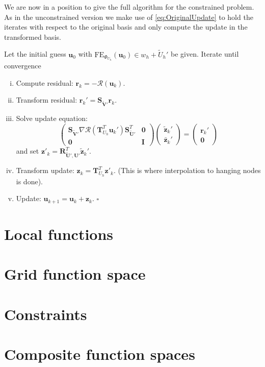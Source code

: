 We are now in a position to give the full algorithm for the
constrained problem. As in the unconstrained version we make use of
\eqref{eq:OriginalUpdate} to hold the iterates with respect to the
original basis and only compute the update in the transformed basis. 

\begin{algo}
Let the initial guess $\mathbf{u}_{0}$ with
$\text{FE}_{\Phi_{U_h}}(\mathbf{u}_{0}) \in w_h + \tilde{U}_h'$ be given. 
Iterate until convergence
\begin{enumerate}[i)]
\item Compute residual:
  $\mathbf{r}_k=-\mathcal{R}\left(\mathbf{u}_{k}\right)$.
\item Transform residual: $\mathbf{r}_k' = \mathbf{S}_{\tilde{\mathbf{V}}'}
  \mathbf{r}_k$.
\item Solve update equation:
\begin{equation*}
\left(\begin{array}{cc}
\mathbf{S}_{\tilde{\mathbf{V}}'} \nabla
\mathcal{R}\left(\mathbf{T}^T_{U_h}\mathbf{u}_{k}'\right)
\mathbf{S}^T_{\tilde{\mathbf{U}}'} & \mathbf{0}\\
\mathbf{0} & \mathbf{I}
\end{array}\right) 
\left(\begin{array}{c}
\tilde{\mathbf{z}}_{k}'\\
\bar{\mathbf{z}}_{k}'
\end{array}\right) =
\left(\begin{array}{c}
\mathbf{r}_k'\\
\mathbf{0}
\end{array}\right) 
\end{equation*}
and set $\mathbf{z}'_{k} =
\mathbf{R}^T_{\tilde{\mathbf{U}}',\mathbf{U}'} \tilde{\mathbf{z}}_{k}'$.
\item Transform update: $\mathbf{z}_{k} =
  \mathbf{T}^T_{U_h}\mathbf{z}'_k$. (This is where interpolation to
  hanging nodes is done).
\item Update: $\mathbf{u}_{k+1} = \mathbf{u}_k
+ \mathbf{z}_k$. \hfill$\square$
\end{enumerate}
\end{algo}


\section{Local functions}

\section{Grid function space}

\section{Constraints}

\section{Composite function spaces}
